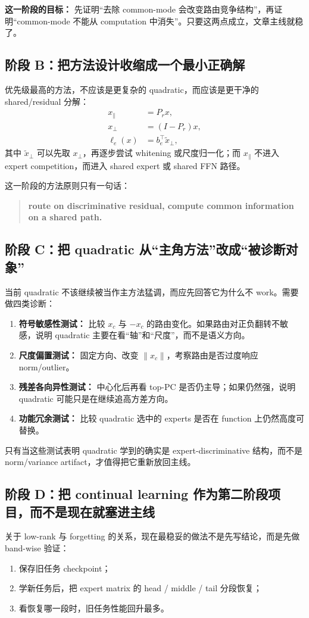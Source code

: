\documentclass[11pt]{article}
\begin{document}
\textbf{这一阶段的目标：} 先证明“去除 common-mode 会改变路由竞争结构”，再证明“common-mode 不能从 computation 中消失”。只要这两点成立，文章主线就稳了。

\subsection{阶段 B：把方法设计收缩成一个最小正确解}
优先级最高的方法，不应该是更复杂的 quadratic，而应该是更干净的 shared/residual 分解：
\begin{align}
    x_{\parallel} &= P_r x,\\
    x_{\perp} &= (I-P_r)x,\\
    \ell_e(x) &= b_e^\top \widetilde{x}_{\perp},
\end{align}
其中 $\widetilde{x}_{\perp}$ 可以先取 $x_{\perp}$，再逐步尝试 whitening 或尺度归一化；而 $x_{\parallel}$ 不进入 expert competition，而进入 shared expert 或 shared FFN 路径。

这一阶段的方法原则只有一句话：
\begin{quote}
\textbf{route on discriminative residual, compute common information on a shared path.}
\end{quote}

\subsection{阶段 C：把 quadratic 从“主角方法”改成“被诊断对象”}
当前 quadratic 不该继续被当作主方法猛调，而应先回答它为什么不 work。需要做四类诊断：
\begin{enumerate}
    \item \textbf{符号敏感性测试：} 比较 $x_c$ 与 $-x_c$ 的路由变化。如果路由对正负翻转不敏感，说明 quadratic 主要在看“轴”和“尺度”，而不是语义方向。
    \item \textbf{尺度偏置测试：} 固定方向、改变 $\lVert x_c \rVert$，考察路由是否过度响应 norm/outlier。
    \item \textbf{残差各向异性测试：} 中心化后再看 top-PC 是否仍主导；如果仍然强，说明 quadratic 可能只是在继续追高方差方向。
    \item \textbf{功能冗余测试：} 比较 quadratic 选中的 experts 是否在 function 上仍然高度可替换。
\end{enumerate}

只有当这些测试表明 quadratic 学到的确实是 expert-discriminative 结构，而不是 norm/variance artifact，才值得把它重新放回主线。

\subsection{阶段 D：把 continual learning 作为第二阶段项目，而不是现在就塞进主线}
关于 low-rank 与 forgetting 的关系，现在最稳妥的做法不是先写结论，而是先做 band-wise 验证：
\begin{enumerate}
    \item 保存旧任务 checkpoint；
    \item 学新任务后，把 expert matrix 的 head / middle / tail 分段恢复；
    \item 看恢复哪一段时，旧任务性能回升最多。
\end{enumerate}
\end{document}
